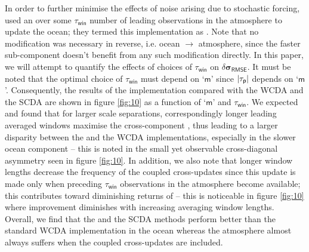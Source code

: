 \documentclass[a4paper,10pt]{article}
\begin{document}
\begin{multicols}{2}
{\noindent}In order to further minimise the effects of noise arising due to stochastic forcing, \citet{lu2015a} used an  over some $\tau_\mathsf{win}$ number of leading observations in the atmosphere to update the ocean; they termed this implementation as {\lacc} \citep{lu2015a, lu2015b}. Note that no modification was necessary in reverse, i.e. ocean $\rightarrow$ atmosphere, since the faster sub-component doesn't benefit from any such modification directly. In this paper, we will attempt to quantify the effects of choices of $\tau_\mathsf{win}$ on $\delta\boldsymbol{\sigma}_\mathsf{RMSE}$. It must be noted that the optimal choice of $\tau_\mathsf{win}$ must depend on `$\mathsf{m}$' since $|\tau_\mathsf{p}|$ depends on `$\mathsf{m}$'. Consequently, the results of the {\lacc} implementation compared with the \textsf{WCDA} and the \textsf{SCDA} are shown in figure \ref{fig:10} as a function of `$\mathsf{m}$' and $\tau_\mathsf{win}$. We expected and found that for larger scale separations, correspondingly longer leading averaged windows maximise the cross-component {\snr}, thus leading to a larger disparity between the {\lacc} and the \textsf{WCDA} implementations, especially in the slower ocean component -- this is noted in the small yet observable cross-diagonal asymmetry seen in figure \ref{fig:10}. In addition, we also note that longer window lengths decrease the frequency of the coupled cross-updates since this update is made only when preceding $\tau_\mathsf{win}$ observations in the atmosphere become available; this contributes toward diminishing returns of {\lacc} -- this is noticeable in figure \ref{fig:10} where improvement diminishes with increasing averaging window lengths. Overall, we find that the {\lacc} and the \textsf{SCDA} methods perform better than the standard \textsf{WCDA} implementation in the ocean whereas the atmosphere almost always suffers when the coupled cross-updates are included. 

\end{multicols}
\end{document}
